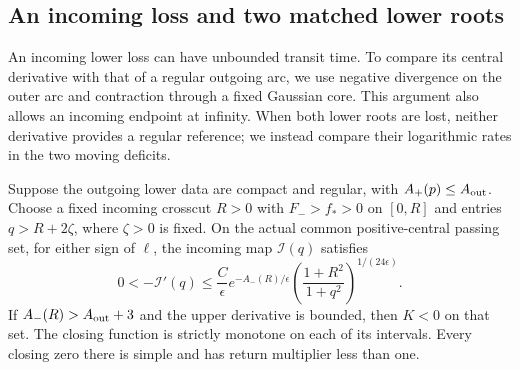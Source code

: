 \subsection{An incoming loss and two matched lower roots}

An incoming lower loss can have unbounded transit time. To compare
its central derivative with that of a regular outgoing arc, we use
negative divergence on the outer arc and contraction through a fixed
Gaussian core. This argument also allows an incoming endpoint at
infinity. When both lower roots are lost, neither derivative provides
a regular reference; we instead compare their logarithmic rates in
the two moving deficits.

\begin{lemma}\label{rw:finite:incoming-contraction}
Suppose the outgoing lower data are compact and regular, with
$A_+(p)\le A_{\rm out}$. Choose a fixed incoming crosscut $R>0$
with $F_->f_*>0$ on $[0,R]$ and entries $q>R+2\zeta$, where
$\zeta>0$ is fixed. On the actual common positive-central passing
set, for either sign of $\ell$, the incoming map $\mathcal I(q)$
satisfies
\begin{equation}\label{rw:finite:incoming-bound}
 0<-\mathcal I'(q)\le\frac C\epsilon e^{-A_-(R)/\epsilon}
        \left(\frac{1+R^2}{1+q^2}\right)^{1/(24\epsilon)}.
\end{equation}
If $A_-(R)>A_{\rm out}+3$ and the upper derivative is bounded,
then $K<0$ on that set. The closing function is strictly monotone
on each of its intervals. Every closing zero there is simple and
has return multiplier less than one.
\end{lemma}
